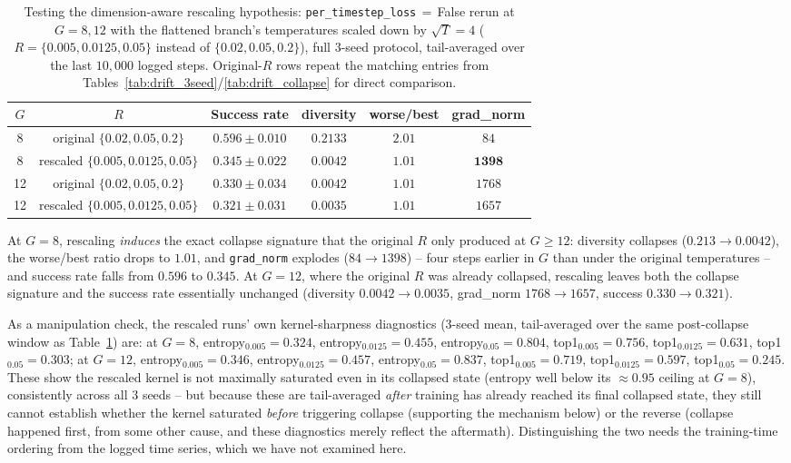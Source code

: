 \documentclass[11pt]{article}
\begin{document}
\begin{table}[H]
\centering
\caption{Testing the dimension-aware rescaling hypothesis: \texttt{per\_timestep\_loss}\,$=$\,False rerun at $G=8,12$ with the flattened branch's temperatures scaled down by $\sqrt{T}=4$ ($R=\{0.005,0.0125,0.05\}$ instead of $\{0.02,0.05,0.2\}$), full 3-seed protocol, tail-averaged over the last $10{,}000$ logged steps. Original-$R$ rows repeat the matching entries from Tables~\ref{tab:drift_3seed}/\ref{tab:drift_collapse} for direct comparison.}
\label{tab:temp_rescale}
\begin{tabular}{cccccc}
\toprule
$G$ & $R$ & Success rate & diversity & worse/best & grad\_norm \\
\midrule
8  & original $\{0.02,0.05,0.2\}$     & $0.596 \pm 0.010$ & $0.2133$ & $2.01$ & $84$ \\
8  & rescaled $\{0.005,0.0125,0.05\}$ & $\mathbf{0.345 \pm 0.022}$ & $\mathbf{0.0042}$ & $\mathbf{1.01}$ & $\mathbf{1398}$ \\
12 & original $\{0.02,0.05,0.2\}$     & $0.330 \pm 0.034$ & $0.0042$ & $1.01$ & $1768$ \\
12 & rescaled $\{0.005,0.0125,0.05\}$ & $0.321 \pm 0.031$ & $0.0035$ & $1.01$ & $1657$ \\
\bottomrule
\end{tabular}
\end{table}

At $G=8$, rescaling \emph{induces} the exact collapse signature that the
original $R$ only produced at $G\ge12$: diversity collapses
($0.213\to0.0042$), the worse/best ratio drops to $1.01$, and
\texttt{grad\_norm} explodes ($84\to1398$) -- four steps earlier in $G$
than under the original temperatures -- and success rate falls from
$0.596$ to $0.345$. At $G=12$, where the original $R$ was already
collapsed, rescaling leaves both the collapse signature and the success
rate essentially unchanged (diversity $0.0042\to0.0035$, grad\_norm
$1768\to1657$, success $0.330\to0.321$).

As a manipulation check, the rescaled runs' own kernel-sharpness
diagnostics (3-seed mean, tail-averaged over the same post-collapse
window as Table~\ref{tab:temp_rescale}) are: at $G=8$,
entropy$_{0.005}=0.324$, entropy$_{0.0125}=0.455$, entropy$_{0.05}=0.804$,
top1$_{0.005}=0.756$, top1$_{0.0125}=0.631$, top1$_{0.05}=0.303$; at
$G=12$, entropy$_{0.005}=0.346$, entropy$_{0.0125}=0.457$,
entropy$_{0.05}=0.837$, top1$_{0.005}=0.719$, top1$_{0.0125}=0.597$,
top1$_{0.05}=0.245$. These show the rescaled kernel is not maximally
saturated even in its collapsed state (entropy well below its
$\approx0.95$ ceiling at $G=8$), consistently across all 3 seeds -- but
because these are tail-averaged \emph{after} training has already reached
its final collapsed state, they still cannot establish whether the
kernel saturated \emph{before} triggering collapse (supporting the
mechanism below) or the reverse (collapse happened first, from some
other cause, and these diagnostics merely reflect the aftermath).
Distinguishing the two needs the training-time ordering from the logged
time series, which we have not examined here.
\end{document}
